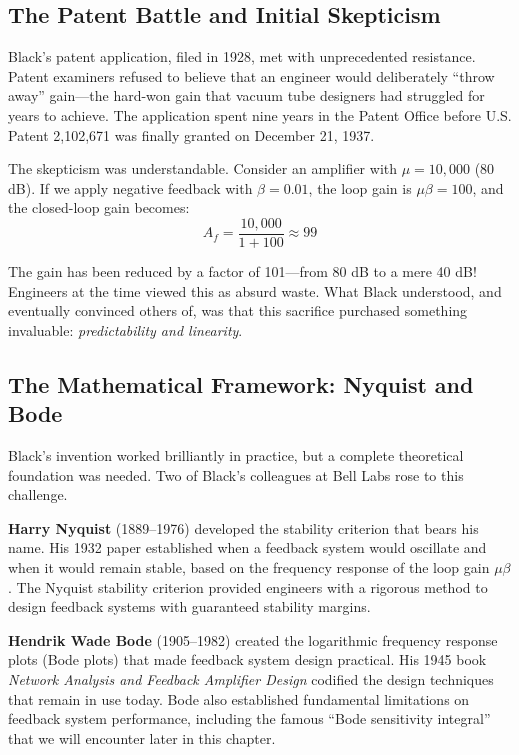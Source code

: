 \subsection{The Patent Battle and Initial Skepticism}

Black's patent application, filed in 1928, met with unprecedented resistance. Patent examiners refused to believe that an engineer would deliberately ``throw away'' gain---the hard-won gain that vacuum tube designers had struggled for years to achieve. The application spent nine years in the Patent Office before U.S. Patent 2,102,671 was finally granted on December 21, 1937.

The skepticism was understandable. Consider an amplifier with $\mu = 10{,}000$ (80 dB). If we apply negative feedback with $\beta = 0.01$, the loop gain is $\mu\beta = 100$, and the closed-loop gain becomes:
\begin{equation}
A_f = \frac{10{,}000}{1 + 100} \approx 99
\end{equation}

The gain has been reduced by a factor of 101---from 80 dB to a mere 40 dB! Engineers at the time viewed this as absurd waste. What Black understood, and eventually convinced others of, was that this sacrifice purchased something invaluable: \textit{predictability and linearity}.

\subsection{The Mathematical Framework: Nyquist and Bode}

Black's invention worked brilliantly in practice, but a complete theoretical foundation was needed. Two of Black's colleagues at Bell Labs rose to this challenge.

\textbf{Harry Nyquist} (1889--1976) developed the stability criterion that bears his name. His 1932 paper established when a feedback system would oscillate and when it would remain stable, based on the frequency response of the loop gain $\mu\beta$. The Nyquist stability criterion provided engineers with a rigorous method to design feedback systems with guaranteed stability margins.

\textbf{Hendrik Wade Bode} (1905--1982) created the logarithmic frequency response plots (Bode plots) that made feedback system design practical. His 1945 book \textit{Network Analysis and Feedback Amplifier Design} codified the design techniques that remain in use today. Bode also established fundamental limitations on feedback system performance, including the famous ``Bode sensitivity integral'' that we will encounter later in this chapter.


